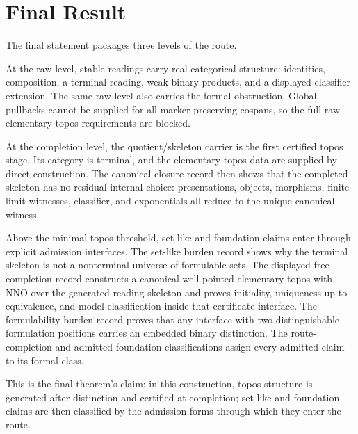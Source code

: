 \documentclass[11pt]{article}
\begin{document}
\section{Final Result}

The final statement packages three levels of the route.

At the raw level, stable readings carry real categorical structure:
identities, composition, a terminal reading, weak binary products, and a
displayed classifier extension.  The same raw level also carries the
formal obstruction.  Global pullbacks cannot be supplied for all
marker-preserving cospans, so the full raw elementary-topos requirements
are blocked.

At the completion level, the quotient/skeleton carrier is the first
certified topos stage.  Its category is terminal, and the elementary
topos data are supplied by direct construction.  The canonical closure
record then shows that the completed skeleton has no residual internal
choice: presentations, objects, morphisms, finite-limit witnesses,
classifier, and exponentials all reduce to the unique canonical witness.

Above the minimal topos threshold, set-like and foundation claims enter
through explicit admission interfaces.  The set-like burden record shows
why the terminal skeleton is not a nonterminal universe of formulable
sets.  The displayed free completion record constructs a canonical
well-pointed elementary topos with NNO over the generated reading
skeleton and proves initiality, uniqueness up to equivalence, and model
classification inside that certificate interface.  The
formulability-burden record proves that any interface with two
distinguishable formulation positions carries an embedded binary
distinction.  The route-completion and admitted-foundation
classifications assign every admitted claim to its formal class.

This is the final theorem's claim: in this construction, topos structure
is generated after distinction and certified at completion; set-like and
foundation claims are then classified by the admission forms through
which they enter the route.
\end{document}
